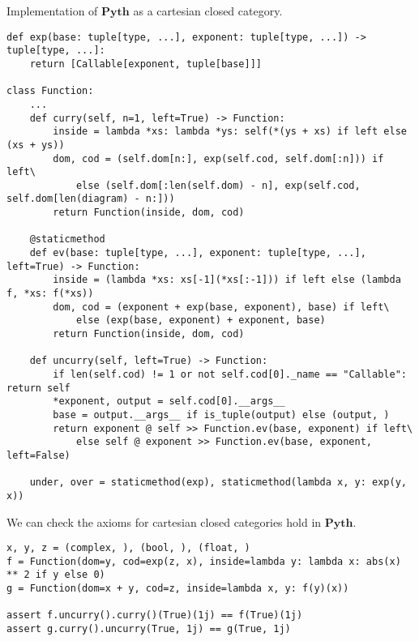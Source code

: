 \begin{python}\label{example:closed-function}
{\normalfont Implementation of $\mathbf{Pyth}$ as a cartesian closed category.}

\begin{verbatim}
def exp(base: tuple[type, ...], exponent: tuple[type, ...]) -> tuple[type, ...]:
    return [Callable[exponent, tuple[base]]]

class Function:
    ...
    def curry(self, n=1, left=True) -> Function:
        inside = lambda *xs: lambda *ys: self(*(ys + xs) if left else (xs + ys))
        dom, cod = (self.dom[n:], exp(self.cod, self.dom[:n])) if left\
            else (self.dom[:len(self.dom) - n], exp(self.cod, self.dom[len(diagram) - n:]))
        return Function(inside, dom, cod)

    @staticmethod
    def ev(base: tuple[type, ...], exponent: tuple[type, ...], left=True) -> Function:
        inside = (lambda *xs: xs[-1](*xs[:-1])) if left else (lambda f, *xs: f(*xs))
        dom, cod = (exponent + exp(base, exponent), base) if left\
            else (exp(base, exponent) + exponent, base)
        return Function(inside, dom, cod)

    def uncurry(self, left=True) -> Function:
        if len(self.cod) != 1 or not self.cod[0]._name == "Callable": return self
        *exponent, output = self.cod[0].__args__
        base = output.__args__ if is_tuple(output) else (output, )
        return exponent @ self >> Function.ev(base, exponent) if left\
            else self @ exponent >> Function.ev(base, exponent, left=False)

    under, over = staticmethod(exp), staticmethod(lambda x, y: exp(y, x))
\end{verbatim}
\end{python}

\begin{example}
We can check the axioms for cartesian closed categories hold in $\mathbf{Pyth}$.

\begin{verbatim}
x, y, z = (complex, ), (bool, ), (float, )
f = Function(dom=y, cod=exp(z, x), inside=lambda y: lambda x: abs(x) ** 2 if y else 0)
g = Function(dom=x + y, cod=z, inside=lambda x, y: f(y)(x))

assert f.uncurry().curry()(True)(1j) == f(True)(1j)
assert g.curry().uncurry(True, 1j) == g(True, 1j)
\end{verbatim}
\end{example}

